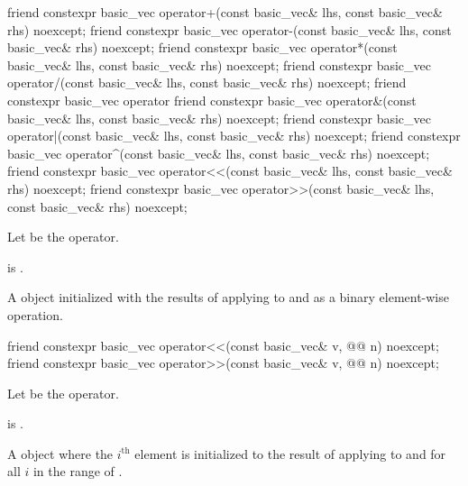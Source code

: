 \begin{itemdecl}
friend constexpr basic_vec operator+(const basic_vec& lhs, const basic_vec& rhs) noexcept;
friend constexpr basic_vec operator-(const basic_vec& lhs, const basic_vec& rhs) noexcept;
friend constexpr basic_vec operator*(const basic_vec& lhs, const basic_vec& rhs) noexcept;
friend constexpr basic_vec operator/(const basic_vec& lhs, const basic_vec& rhs) noexcept;
friend constexpr basic_vec operator%
friend constexpr basic_vec operator&(const basic_vec& lhs, const basic_vec& rhs) noexcept;
friend constexpr basic_vec operator|(const basic_vec& lhs, const basic_vec& rhs) noexcept;
friend constexpr basic_vec operator^(const basic_vec& lhs, const basic_vec& rhs) noexcept;
friend constexpr basic_vec operator<<(const basic_vec& lhs, const basic_vec& rhs) noexcept;
friend constexpr basic_vec operator>>(const basic_vec& lhs, const basic_vec& rhs) noexcept;
\end{itemdecl}

\begin{itemdescr}
\pnum
Let  be the operator.

\pnum
\constraints
{} is
.

\pnum
\returns
A  object initialized with the results of applying
 to  and  as a binary element-wise
operation.
\end{itemdescr}

\begin{itemdecl}
friend constexpr basic_vec operator<<(const basic_vec& v, @@ n) noexcept;
friend constexpr basic_vec operator>>(const basic_vec& v, @@ n) noexcept;
\end{itemdecl}

\begin{itemdescr}
\pnum
Let  be the operator.

\pnum
\constraints
{} is .

\pnum
\returns
A  object where the $i^\text{th}$ element is initialized to
the result of applying  to  and  for all
$i$ in the range of .
\end{itemdescr}

